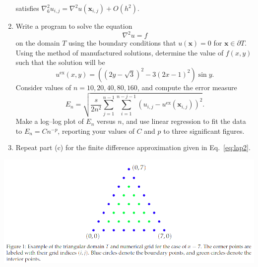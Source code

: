 \documentclass{article}
\newcommand{\p}{\partial}
\renewcommand{\vec}[1]{\mathbf{#1}}
\newcommand{\vx}{\vec{x}}
\begin{document}
\begin{problem}
\begin{enumerate}
                satisfies $\nabla^2_6u_{i,j} = \nabla^2 u(\vx_{i,j}) + O(h^2)$.
          \item Write a program to solve the equation
                \begin{equation}
                  \nabla^2 u = f
                \end{equation}
                on the domain $T$ using the boundary conditions that $u(\vx)=0$ for
                $\vx\in \p T$. Using the method of manufactured solutions, determine
                the value of $f(x,y)$ such that the solution will be
                \begin{equation}
                  u^{\text{ex}}(x,y) = \left( (2y-\sqrt{3})^2- 3(2x-1)^2 \right) \sin y.
                \end{equation}
                Consider values of $n=10,20,40,80,160$, and compute the error measure
                \begin{equation}
                  E_n = \sqrt{\frac{s}{2n^2} \sum_{j=1}^{n-1} \sum_{i=1}^{n-j-1} (u_{i,j}-u^{\text{ex}}(\vx_{i,j}))^2}.
                \end{equation}
                Make a log--log plot of $E_n$ versus $n$, and use linear regression to
                fit the data to $E_n = C n^{-p}$, reporting your values of $C$ and $p$ to
                three significant figures.
          \item Repeat part (c) for the finite difference approximation given in Eq.~\eqref{eq:lap2}.
        \end{enumerate}
        \begin{center}
          \includegraphics[width=1.0\textwidth]{tri.png}
        \end{center}
\end{problem}
\end{document}
